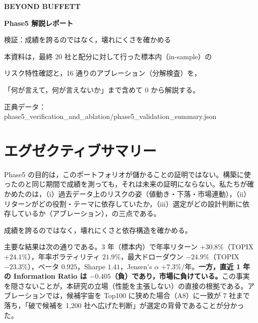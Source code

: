 \documentclass[a4paper,10pt]{article}
\begin{document}
\begin{titlepage}
\centering
\vspace*{12mm}
{\sffamily\bfseries\Huge BEYOND BUFFETT\par}
\vspace{6mm}
{\sffamily\bfseries\LARGE Phase5 解説レポート\par}
\vspace{3mm}
{\sffamily\Large 検証：成績を誇るのではなく，壊れにくさを確かめる\par}
\vspace{14mm}
{\large 本資料は，最終 20 社と配分に対して行った標本内（in-sample）の\par}
{\large リスク特性確認と，16 通りのアブレーション（分解検査）を，\par}
{\large 「何が言えて，何が言えないか」まで含めて 0 から解説する。\par}
\vfill
{\small 正典データ：phase5\_verification\_and\_ablation/phase5\_validation\_summary.json\par}
\end{titlepage}

\setcounter{tocdepth}{2}
\tableofcontents
\clearpage

\section{エグゼクティブサマリー}

Phase5 の目的は，このポートフォリオが儲かることの証明ではない。構築に使ったのと同じ期間で成績を測っても，それは未来の証明にならない。私たちが確かめたのは，（i）過去データ上のリスクの姿（値動き・下落・市場連動），（ii）リターンがどの役割・テーマに依存していたか，（iii）選定がどの設計判断に依存しているか（アブレーション），の三点である。

\begin{keybox}
\centering
\Large 成績を誇るのではなく，壊れにくさと依存構造を確かめる。
\end{keybox}

主要な結果は次の通りである。3 年（標本内）で年率リターン $+30.8\%$（TOPIX $+24.1\%$），年率ボラティリティ $21.9\%$，最大ドローダウン $-24.9\%$（TOPIX $-23.3\%$），ベータ $0.925$，Sharpe $1.41$，Jensen's $\alpha$ $+7.3\%$/年。\textbf{一方，直近 1 年の Information Ratio は $-0.405$（負）であり，市場に負けている。}この事実を隠さないことが，本研究の立場（性能を主張しない）の直接の根拠である。アブレーションでは，候補宇宙を Top100 に狭めた場合（A8）に一致が 7 社まで落ち，「破で候補を 1{,}200 社へ広げた判断」が選定の背骨であることが分かった。
\end{document}
